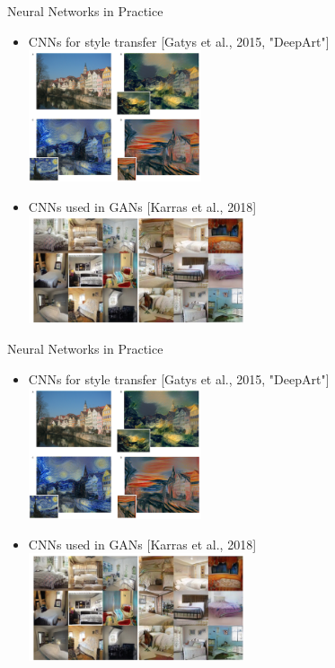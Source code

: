 \documentclass{beamer}
\begin{document}
\begin{frame}{Neural Networks in Practice}
\begin{itemize}
\item CNNs for style transfer [Gatys et al., 2015, "DeepArt"]
\includegraphics[width=0.4\textwidth]{cnn_app4}
\item CNNs used in GANs [Karras et al., 2018]\\
\includegraphics[width=0.5\textwidth]{cnn_app5}
\end{itemize}
\end{frame}

\begin{frame}{Neural Networks in Practice}
\begin{itemize}
\item CNNs for style transfer [Gatys et al., 2015, "DeepArt"]
\includegraphics[width=0.4\textwidth]{cnn_app4}
\item CNNs used in GANs [Karras et al., 2018]\\
\includegraphics[width=0.5\textwidth]{cnn_app5}
\end{itemize}
\end{frame}


\newpage


\end{document}
